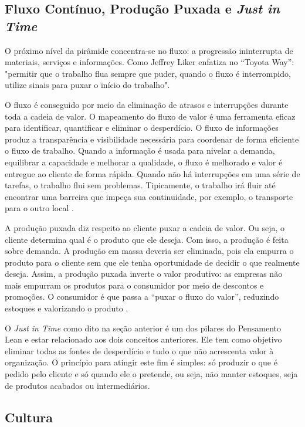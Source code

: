 \begin{anexosenv}
\subsection[Fluxo Contínuo, Produção Puxada e \textit{Just in Time}]{Fluxo Contínuo, Produção Puxada e \textit{Just in Time}}

O próximo nível da pirâmide concentra-se no fluxo: a progressão ininterrupta de materiais, serviços e informações.  Como Jeffrey Liker enfatiza no “Toyota Way”: "permitir que o trabalho flua sempre que puder, quando o fluxo é interrompido, utilize sinais para puxar o início do trabalho".

O fluxo é conseguido por meio da eliminação de atrasos e interrupções durante toda a cadeia de valor. O mapeamento do fluxo de valor é uma ferramenta eficaz para identificar, quantificar e eliminar o desperdício. O fluxo de informações produz a transparência e visibilidade necessária para coordenar de forma eficiente o fluxo de trabalho. Quando a informação é usada para nivelar a demanda, equilibrar a capacidade e melhorar a qualidade, o fluxo é melhorado e valor é entregue ao cliente de forma rápida. Quando não há interrupções em uma série de tarefas, o trabalho flui sem problemas. Tipicamente, o trabalho irá fluir até encontrar uma barreira que impeça sua continuidade, por exemplo, o transporte para o outro local \cite{bell2011}. 

A produção puxada diz respeito ao cliente puxar a cadeia de valor. Ou seja, o cliente determina qual é o produto que ele deseja. Com isso, a produção é feita sobre demanda. A produção em massa deveria ser eliminada, pois ela empurra o produto para o cliente sem que ele tenha oportunidade de decidir o que realmente deseja. Assim, a produção puxada inverte o valor produtivo: as empresas não mais empurram os produtos para o consumidor por meio de descontos e promoções. O consumidor é que passa a “puxar o fluxo do valor”, reduzindo estoques e valorizando o produto \cite{bell2011}.

O \textit{Just in Time} como dito na seção anterior é um dos pilares do Pensamento Lean e estar relacionado aos dois conceitos anteriores. Ele tem como objetivo eliminar todas as fontes de desperdício e tudo o que não acrescenta valor à organização. O princípio para atingir este fim é simples: só produzir o que é pedido pelo cliente e só quando ele o pretende, ou seja, não manter estoques, seja de produtos acabados ou intermediários. 

\subsection[Cultura]{Cultura}


\end{anexosenv}
